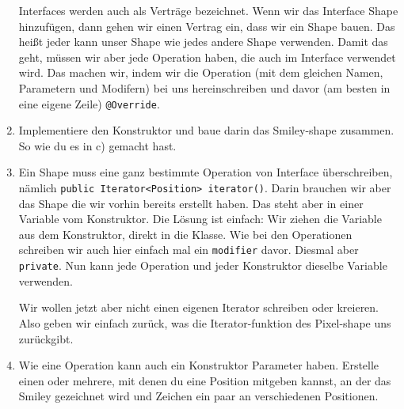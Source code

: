 \begin{enumerate}
\begin{Infobox}[Interface]
        Interfaces werden auch als Verträge bezeichnet.
Wenn wir das Interface Shape hinzufügen, dann gehen wir einen Vertrag ein, dass wir ein Shape bauen.
Das heißt jeder kann unser Shape wie jedes andere Shape verwenden.
Damit das geht, müssen wir aber jede Operation haben, die auch im Interface verwendet wird.
Das machen wir, indem wir die Operation (mit dem gleichen Namen, Parametern und Modifern) bei uns hereinschreiben und davor (am besten in eine eigene Zeile) \lstinline{@Override}.
    \end{Infobox}    
    \item Implementiere den Konstruktor und baue darin das Smiley-shape zusammen. So wie du es in c) gemacht hast.
    \item Ein Shape muss eine ganz bestimmte Operation von Interface überschreiben, nämlich \lstinline{public Iterator<Position> iterator()}.
    Darin brauchen wir aber das Shape die wir vorhin bereits erstellt haben.
    Das steht aber in einer Variable vom Konstruktor.
    Die Lösung ist einfach: Wir ziehen die Variable aus dem Konstruktor, direkt in die Klasse.
    Wie bei den Operationen schreiben wir auch hier einfach mal ein  \lstinline{modifier} davor. Diesmal aber \lstinline{private}.
    Nun kann jede Operation und jeder Konstruktor dieselbe Variable verwenden.

    Wir wollen jetzt aber nicht einen eigenen Iterator schreiben oder kreieren. Also geben wir einfach zurück, was die Iterator-funktion des Pixel-shape uns zurückgibt.
\item Wie eine Operation kann auch ein Konstruktor Parameter haben.
Erstelle einen oder mehrere, mit denen du eine Position mitgeben kannst, an der das Smiley gezeichnet wird
und Zeichen ein paar an verschiedenen Positionen.
\end{enumerate}

\newpage
